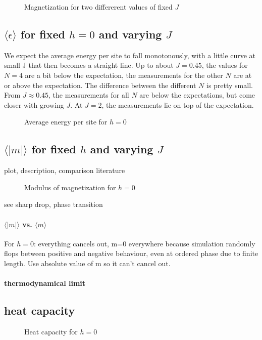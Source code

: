 \documentclass{scrartcl}
\begin{document}
	\begin{figure}[htbp]
		
		\caption{Magnetization for two differerent values of fixed $J$}
		\label{fig:magfixJ}
	\end{figure}

\subsection{$\langle \epsilon\rangle$ for fixed $h=0$ and varying $J$}
We expect the average energy per site to fall monotonously, with a little curve at small J that then becomes a straight line. Up to about $J=0.45$, the values for $N=4$ are a bit below the expectation, the measurements for the other $N$ are at or above the expectation. The difference between the different $N$ is pretty small. From $J\approx0.45$, the measurements for all $N$ are below the expectations, but come closer with growing $J$. At $J=2$, the measurements lie on top of the expectation. 
	\begin{figure}[htbp]
		
		\caption{Average energy per site for $h=0$}
		\label{fig:energy}
	\end{figure}

\subsection{$\langle |m|\rangle$ for fixed $h$ and varying $J$}
plot, description, comparison literature

	\begin{figure}[htbp]
		
		\caption{Modulus of magnetization for $h=0$}
		\label{fig:absmag}
	\end{figure}
see sharp drop, phase transition
\paragraph{$\langle |m|\rangle$ vs. $\langle m\rangle$}
For $h=0$: everything cancels out, m=0 everywhere because simulation randomly flops between positive and negative behaviour, even at ordered phase due to finite length.
Use absolute value of m so it can't cancel out.

\paragraph{thermodynamical limit}

\subsection{heat capacity}

	\begin{figure}[htbp]
		
		\caption{Heat capacity for $h=0$}
		\label{fig:heat}
	\end{figure}

\newpage	
\listoffigures
\printbibliography
\end{document}
